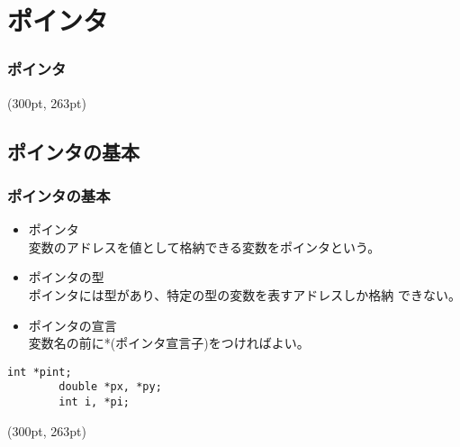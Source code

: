 \documentclass[dvipdfmx]{beamer}
\begin{document}
\section{ポインタ}
\begin{frame}[t, label=65]
    \frametitle{ポインタ}
    \tableofcontents[sections={2, 11}]
    \begin{textblock*}{0.3\linewidth}(300pt, 263pt)
        \hyperlink{64}{}
        \space
        \hyperlink{66}{}
    \end{textblock*}
\end{frame}

\subsection{ポインタの基本}
\begin{frame}[t, fragile, label=66]
    \frametitle{ポインタの基本}
    \begin{itemize}
        \item ポインタ\\
            変数のアドレスを値として格納できる変数をポインタという。
        \item ポインタの型\\
            ポインタには型があり、特定の型の変数を表すアドレスしか格納
            できない。
        \item ポインタの宣言\\
            変数名の前に*(ポインタ宣言子)をつければよい。
    \end{itemize}
    \begin{lstlisting}[gobble=8, caption=Example\space of\space Pointer\space Declaration]
        int *pint;
        double *px, *py;
        int i, *pi;
    \end{lstlisting}
    \begin{textblock*}{0.3\linewidth}(300pt, 263pt)
        \hyperlink{65}{}
        \space
        \hyperlink{67}{}
    \end{textblock*}
\end{frame}
\end{document}
